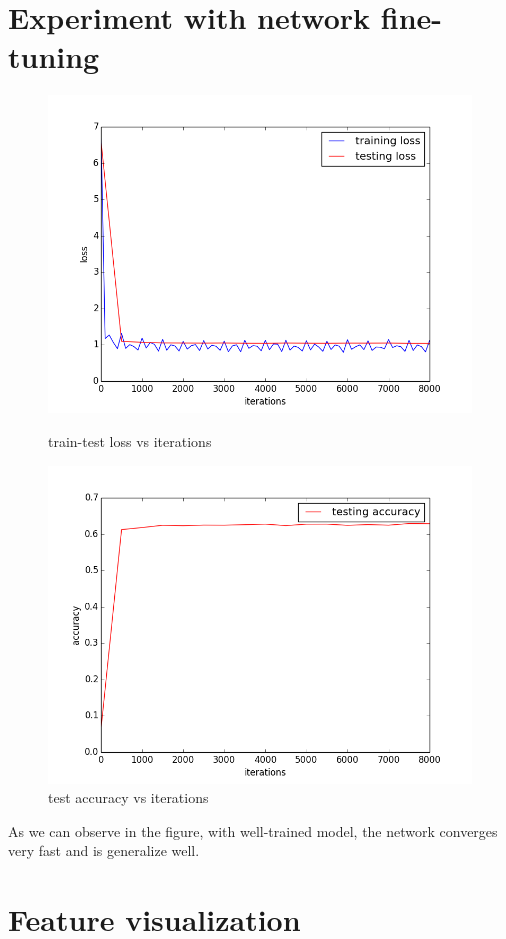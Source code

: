 \documentclass{article} %
\begin{document}
\section{Experiment with network fine-tuning}
\begin{figure}[H]
    \begin{minipage}{0.5\linewidth}
        \centering
        \includegraphics[scale=0.35]{finetune_1.png}
        \caption{train-test loss vs iterations}
    \end{minipage}
    \begin{minipage}{0.5\linewidth}
        \centering
        \includegraphics[scale=0.35]{finetune_2.png}
     \caption{test accuracy vs iterations}
    \end{minipage}
\end{figure}
As we can observe in the figure, with well-trained model, the network converges very fast and is generalize well.
\section{Feature visualization}
\end{document}

